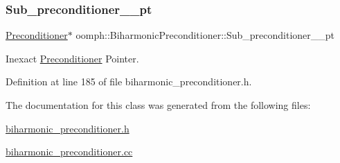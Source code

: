 \subsubsection{\texorpdfstring{Sub\+\_\+preconditioner\+\_\+\_\+pt}{Sub\_preconditioner\_2\_pt}}
{\footnotesize\ttfamily \hyperlink{classoomph_1_1Preconditioner}{Preconditioner}$\ast$ oomph\+::\+Biharmonic\+Preconditioner\+::\+Sub\+\_\+preconditioner\+\_\+\_\+pt\hspace{0.3cm}{\ttfamily [private]}}



Inexact \hyperlink{classoomph_1_1Preconditioner}{Preconditioner} Pointer. 



Definition at line 185 of file biharmonic\+\_\+preconditioner.\+h.



The documentation for this class was generated from the following files\+:\begin{DoxyCompactItemize}
\item 
\hyperlink{biharmonic__preconditioner_8h}{biharmonic\+\_\+preconditioner.\+h}\item 
\hyperlink{biharmonic__preconditioner_8cc}{biharmonic\+\_\+preconditioner.\+cc}\end{DoxyCompactItemize}
